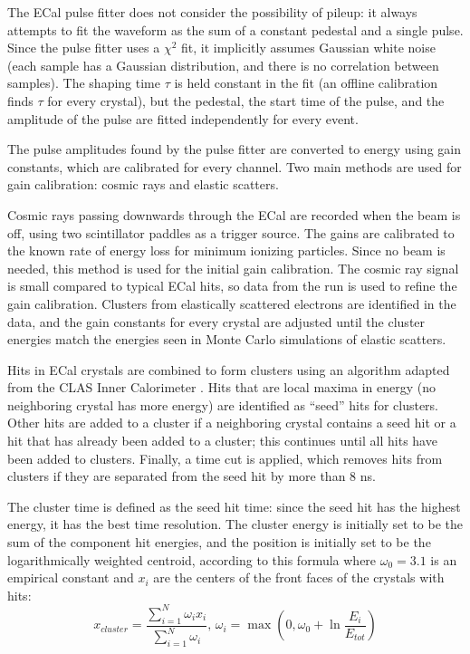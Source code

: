 The ECal pulse fitter does not consider the possibility of pileup: it always attempts to fit the waveform as the sum of a constant pedestal and a single pulse.
Since the pulse fitter uses a $\chi^2$ fit, it implicitly assumes Gaussian white noise (each sample has a Gaussian distribution, and there is no correlation between samples).
The shaping time $\tau$ is held constant in the fit (an offline calibration finds $\tau$ for every crystal), but the pedestal, the start time of the pulse, and the amplitude of the pulse are fitted independently for every event.

The pulse amplitudes found by the pulse fitter are converted to energy using gain constants, which are calibrated for every channel.
Two main methods are used for gain calibration: cosmic rays and elastic scatters.

Cosmic rays passing downwards through the ECal are recorded when the beam is off, using two scintillator paddles as a trigger source.
The gains are calibrated to the known rate of energy loss for minimum ionizing particles.
Since no beam is needed, this method is used for the initial gain calibration.
The cosmic ray signal is small compared to typical ECal hits, so data from the run is used to refine the gain calibration.
Clusters from elastically scattered electrons are identified in the data, and the gain constants for every crystal are adjusted until the cluster energies match the energies seen in Monte Carlo simulations of elastic scatters.

Hits in ECal crystals are combined to form clusters using an algorithm adapted from the CLAS Inner Calorimeter \cite{niyazov_dvcs_2005}.
Hits that are local maxima in energy (no neighboring crystal has more energy) are identified as ``seed'' hits for clusters.
Other hits are added to a cluster if a neighboring crystal contains a seed hit or a hit that has already been added to a cluster; this continues until all hits have been added to clusters.
Finally, a time cut is applied, which removes hits from clusters if they are separated from the seed hit by more than 8 ns.

The cluster time is defined as the seed hit time: since the seed hit has the highest energy, it has the best time resolution.
The cluster energy is initially set to be the sum of the component hit energies, and the position is initially set to be the logarithmically weighted centroid, according to this formula where $\omega_0=3.1$ is an empirical constant and $x_i$ are the centers of the front faces of the crystals with hits:
\begin{equation}
    x_{cluster} = \frac{\sum_{i=1}^{N} \omega_i x_i}{\sum_{i=1}^{N} \omega_i},\, \omega_i = \max\left(0,\omega_0+\ln\frac{E_i}{E_{tot}}\right)
\end{equation}

